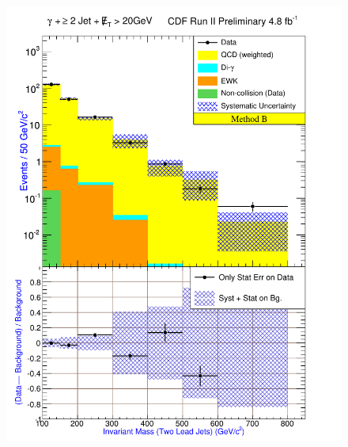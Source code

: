 \documentclass[12pt,twoside,letterpaper,doublespace]{article}
\begin{document}
\begin{figure}[h!]
{\includegraphics[keepaspectratio=true, scale=\figScale]{G30JetsMet20_MtdB_plot2_InvMass_j1j2.pdf}}
\label{fig:pjmetMtdBSetThree}
\end{figure}
\clearpage
\end{document}
